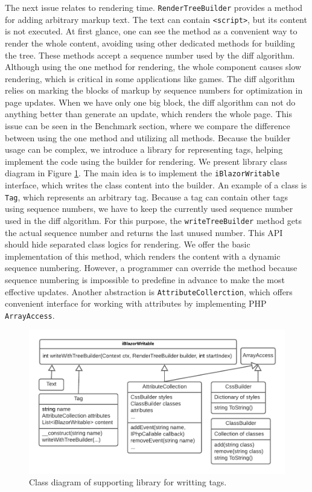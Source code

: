 The next issue relates to rendering time.
\texttt{RenderTreeBuilder} provides a method for adding arbitrary markup text.
The text can contain \texttt{<script>}, but its content is not executed.
At first glance, one can see the method as a convenient way to render the whole content, avoiding using other dedicated methods for building the tree.
These methods accept a sequence number used by the diff algorithm. 
Although using the one method for rendering, the whole component causes slow rendering, which is critical in some applications like games.
The diff algorithm relies on marking the blocks of markup by sequence numbers for optimization in page updates.
When we have only one big block, the diff algorithm can not do anything better than generate an update, which renders the whole page. 
This issue can be seen in the Benchmark section, where we compare the difference between using the one method and utilizing all methods.
Because the builder usage can be complex, we introduce a library for representing tags, helping implement the code using the builder for rendering.
We present library class diagram in Figure \ref{img16:diagram}.
The main idea is to implement the \texttt{iBlazorWritable} interface, which writes the class content into the builder.
An example of a class is \texttt{Tag}, which represents an arbitrary tag.
Because a tag can contain other tags using sequence numbers, we have to keep the currently used sequence number used in the diff algorithm.
For this purpose, the \texttt{writeTreeBuilder} method gets the actual sequence number and returns the last unused number.
This API should hide separated class logics for rendering.
We offer the basic implementation of this method, which renders the content with a dynamic sequence numbering. 
However, a programmer can override the method because sequence numbering is impossible to predefine in advance to make the most effective updates.
Another abstraction is \texttt{AttributeCollerction}, which offers convenient interface for working with attributes by implementing PHP \texttt{ArrayAccess}.
\par
\begin{figure}\centering
\includegraphics[scale=0.8]{./img/ComponentLibrary}
\caption{Class diagram of supporting library for writting tags.}
\label{img16:diagram}
\end{figure} 
